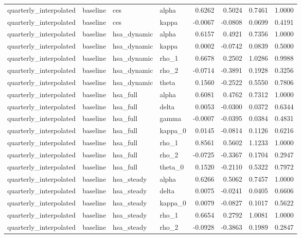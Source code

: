 \begin{tabular}{llllrrrr}
quarterly\_interpolated & baseline & ces & alpha & 0.6262 & 0.5024 & 0.7461 & 1.0000 \\
quarterly\_interpolated & baseline & ces & kappa & -0.0067 & -0.0808 & 0.0699 & 0.4191 \\
quarterly\_interpolated & baseline & hsa\_dynamic & alpha & 0.6157 & 0.4921 & 0.7356 & 1.0000 \\
quarterly\_interpolated & baseline & hsa\_dynamic & kappa & 0.0002 & -0.0742 & 0.0839 & 0.5000 \\
quarterly\_interpolated & baseline & hsa\_dynamic & rho\_1 & 0.6678 & 0.2502 & 1.0286 & 0.9988 \\
quarterly\_interpolated & baseline & hsa\_dynamic & rho\_2 & -0.0714 & -0.3891 & 0.1928 & 0.3256 \\
quarterly\_interpolated & baseline & hsa\_dynamic & theta & 0.1560 & -0.2522 & 0.5550 & 0.7806 \\
quarterly\_interpolated & baseline & hsa\_full & alpha & 0.6081 & 0.4762 & 0.7312 & 1.0000 \\
quarterly\_interpolated & baseline & hsa\_full & delta & 0.0053 & -0.0300 & 0.0372 & 0.6344 \\
quarterly\_interpolated & baseline & hsa\_full & gamma & -0.0007 & -0.0395 & 0.0384 & 0.4831 \\
quarterly\_interpolated & baseline & hsa\_full & kappa\_0 & 0.0145 & -0.0814 & 0.1126 & 0.6216 \\
quarterly\_interpolated & baseline & hsa\_full & rho\_1 & 0.8561 & 0.5602 & 1.1233 & 1.0000 \\
quarterly\_interpolated & baseline & hsa\_full & rho\_2 & -0.0725 & -0.3367 & 0.1704 & 0.2947 \\
quarterly\_interpolated & baseline & hsa\_full & theta\_0 & 0.1520 & -0.2110 & 0.5322 & 0.7972 \\
quarterly\_interpolated & baseline & hsa\_steady & alpha & 0.6266 & 0.5062 & 0.7457 & 1.0000 \\
quarterly\_interpolated & baseline & hsa\_steady & delta & 0.0075 & -0.0241 & 0.0405 & 0.6606 \\
quarterly\_interpolated & baseline & hsa\_steady & kappa\_0 & 0.0079 & -0.0827 & 0.1017 & 0.5622 \\
quarterly\_interpolated & baseline & hsa\_steady & rho\_1 & 0.6654 & 0.2792 & 1.0081 & 1.0000 \\
quarterly\_interpolated & baseline & hsa\_steady & rho\_2 & -0.0928 & -0.3863 & 0.1989 & 0.2847 \\
\bottomrule
\end{tabular}
